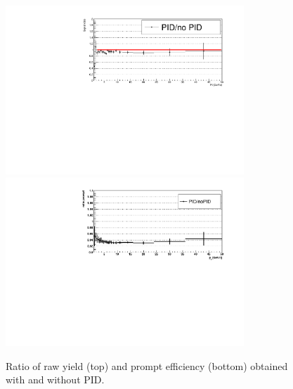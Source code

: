 \begin{figure}[tb]
\begin{center}
\includegraphics[width=0.8\textwidth]{figures/Dstar/pp13TeV/rawyield_ratio_PID_noPID-new.pdf}
 \includegraphics[width=0.8\textwidth]{figures/Dstar/pp13TeV/prompt_PID_noPID_ratio-v3.pdf}
 \caption{Ratio of raw yield (top) and prompt efficiency (bottom) obtained with and without PID.}
\label{fig:PIDsyst}
\end{center}
\end{figure}

